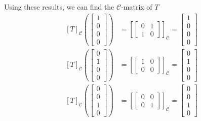 \documentclass[12pt]{exam}
\begin{document}
\begin{questions}
\begin{parts}
\begin{solution}
\begin{align*}
                    \\
                \end{align*}
                Using these results, we can find the $\mathcal C$-matrix of $T$
                \begin{align*}
                    \left[T\right]_\mathcal C \left(\begin{bmatrix} 1 \\ 0 \\ 0 \\ 0 \end{bmatrix}\right) &= \left[\begin{bmatrix*} 0 & 1 \\ 1 & 0 \end{bmatrix*}\right]_\mathcal C = \begin{bmatrix} 1 \\ 0 \\ 0 \\ 0 \end{bmatrix} 
                    \\
                    \left[T\right]_\mathcal C \left(\begin{bmatrix} 0 \\ 1 \\ 0 \\ 0 \end{bmatrix}\right) &= \left[\begin{bmatrix*} 1 & 0 \\ 0 & 0 \end{bmatrix*}\right]_\mathcal C = \begin{bmatrix} 0 \\ 1 \\ 0 \\ 0\end{bmatrix} 
                    \\
                    \left[T\right]_\mathcal C \left(\begin{bmatrix} 0 \\ 0 \\ 1 \\ 0 \end{bmatrix}\right) &= \left[\begin{bmatrix*} 0 & 0 \\ 0 & 1 \end{bmatrix*}\right]_\mathcal C = \begin{bmatrix} 0 \\ 0 \\ 1 \\ 0 \end{bmatrix} 

\end{align*}
\end{solution}
\end{parts}
\end{questions}
\end{document}
